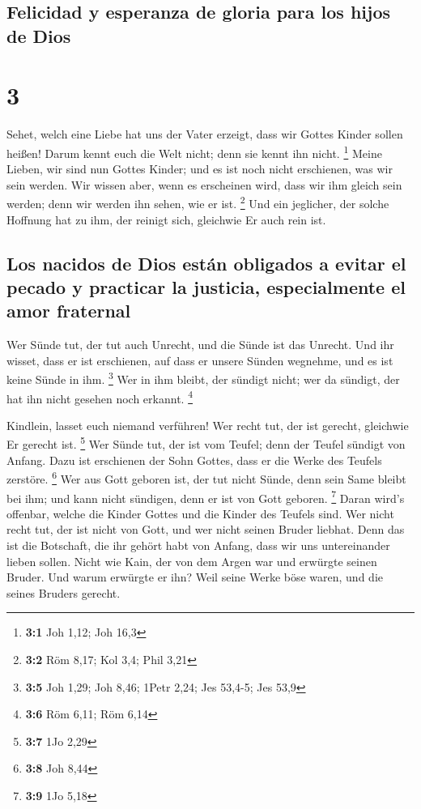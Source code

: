 \hypertarget{felicidad-y-esperanza-de-gloria-para-los-hijos-de-dios}{%
\subsection{Felicidad y esperanza de gloria para los hijos de
Dios}\label{felicidad-y-esperanza-de-gloria-para-los-hijos-de-dios}}

\hypertarget{section-2}{%
\section{3}\label{section-2}}

 Sehet, welch eine Liebe hat uns der Vater erzeigt, dass
wir Gottes Kinder sollen heißen! Darum kennt euch die Welt nicht; denn
sie kennt ihn nicht. \footnote{\textbf{3:1} Joh 1,12; Joh 16,3}
 Meine Lieben, wir sind nun Gottes Kinder; und es ist noch
nicht erschienen, was wir sein werden. Wir wissen aber, wenn es
erscheinen wird, dass wir ihm gleich sein werden; denn wir werden ihn
sehen, wie er ist. \footnote{\textbf{3:2} Röm 8,17; Kol 3,4; Phil 3,21}
 Und ein jeglicher, der solche Hoffnung hat zu ihm, der
reinigt sich, gleichwie Er auch rein ist.

\hypertarget{los-nacidos-de-dios-estuxe1n-obligados-a-evitar-el-pecado-y-practicar-la-justicia-especialmente-el-amor-fraternal}{%
\subsection{Los nacidos de Dios están obligados a evitar el pecado y
practicar la justicia, especialmente el amor
fraternal}\label{los-nacidos-de-dios-estuxe1n-obligados-a-evitar-el-pecado-y-practicar-la-justicia-especialmente-el-amor-fraternal}}

 Wer Sünde tut, der tut auch Unrecht, und die Sünde ist
das Unrecht.  Und ihr wisset, dass er ist erschienen, auf
dass er unsere Sünden wegnehme, und es ist keine Sünde in ihm.
\footnote{\textbf{3:5} Joh 1,29; Joh 8,46; 1Petr 2,24; Jes 53,4-5; Jes
  53,9}  Wer in ihm bleibt, der sündigt nicht; wer da
sündigt, der hat ihn nicht gesehen noch erkannt. \footnote{\textbf{3:6}
  Röm 6,11; Röm 6,14}

 Kindlein, lasset euch niemand verführen! Wer recht tut,
der ist gerecht, gleichwie Er gerecht ist. \footnote{\textbf{3:7} 1Jo
  2,29}  Wer Sünde tut, der ist vom Teufel; denn der
Teufel sündigt von Anfang. Dazu ist erschienen der Sohn Gottes, dass er
die Werke des Teufels zerstöre. \footnote{\textbf{3:8} Joh 8,44}
 Wer aus Gott geboren ist, der tut nicht Sünde, denn sein
Same bleibt bei ihm; und kann nicht sündigen, denn er ist von Gott
geboren. \footnote{\textbf{3:9} 1Jo 5,18}  Daran wird's
offenbar, welche die Kinder Gottes und die Kinder des Teufels sind. Wer
nicht recht tut, der ist nicht von Gott, und wer nicht seinen Bruder
liebhat.  Denn das ist die Botschaft, die ihr gehört habt
von Anfang, dass wir uns untereinander lieben sollen. 
Nicht wie Kain, der von dem Argen war und erwürgte seinen Bruder. Und
warum erwürgte er ihn? Weil seine Werke böse waren, und die seines
Bruders gerecht.

